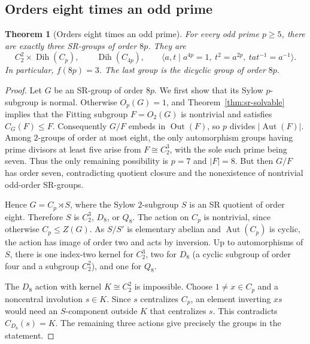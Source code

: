 \documentclass[11pt,a4paper]{amsart}
\newtheorem{thm}{Theorem}[section]
\theoremstyle{definition}
\theoremstyle{remark}
\numberwithin{equation}{section}
\begin{document}
\subsection{Orders eight times an odd prime}
\begin{thm}[Orders eight times an odd prime]\label{thm:eight-prime}
For every odd prime $p\ge5$, there are exactly three SR-groups of
order $8p$. They are
\[
 C_2^2\times\operatorname{Dih}(C_p),\qquad
 \operatorname{Dih}(C_{4p}),\qquad
 \langle a,t\mid a^{4p}=1,\ t^2=a^{2p},\ tat^{-1}=a^{-1}\rangle.
\]
In particular, $f(8p)=3$. The last group is the dicyclic group of
order $8p$.
\end{thm}
\begin{proof}
Let $G$ be an SR-group of order $8p$. We first show that its Sylow
$p$-subgroup is normal. Otherwise $O_p(G)=1$, and Theorem~\ref{thm:sr-solvable} implies
that the Fitting subgroup $F=O_2(G)$ is nontrivial and satisfies
$C_G(F)\le F$. Consequently $G/F$ embeds in $\operatorname{Out}(F)$,
so $p$ divides $|\operatorname{Aut}(F)|$. Among $2$-groups of order at
most eight, the only automorphism groups having prime divisors at
least five arise from $F\cong C_2^3$, with the sole such prime being
seven. Thus the only remaining possibility is $p=7$ and $|F|=8$.
But then $G/F$ has order seven, contradicting quotient closure and
the nonexistence of nontrivial odd-order SR-groups.

Hence $G=C_p\rtimes S$, where the Sylow $2$-subgroup $S$ is an
SR quotient of order eight. Therefore $S$ is $C_2^3$, $D_8$, or $Q_8$.
The action on $C_p$ is nontrivial, since otherwise $C_p\le Z(G)$.
As $S/S'$ is elementary abelian and $\operatorname{Aut}(C_p)$ is
cyclic, the action has image of order two and acts by inversion.
Up to automorphisms of $S$, there is one index-two kernel for $C_2^3$,
two for $D_8$ (a cyclic subgroup of order four and a subgroup $C_2^2$),
and one for $Q_8$.

The $D_8$ action with kernel $K\cong C_2^2$ is impossible. Choose
$1\ne x\in C_p$ and a noncentral involution $s\in K$. Since $s$
centralizes $C_p$, an element inverting $xs$ would need an $S$-component
outside $K$ that centralizes $s$. This contradicts
$C_{D_8}(s)=K$. The remaining three actions give precisely the groups
in the statement.


\end{proof}
\end{document}
